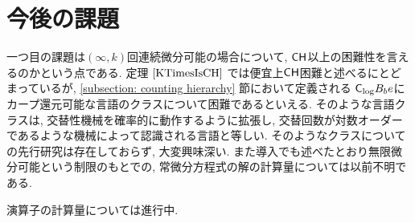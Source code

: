 \section{今後の課題}
一つ目の課題は$(\infty, k)$回連続微分可能の場合について,
$\mathsf{CH}$以上の困難性を言えるのかという点である.
定理 $\ref{KTimesIsCH}$ では便宜上$\mathsf{CH}$困難と述べるにとどまっているが,
\ref{subsection: counting hierarchy} 節において定義される
$\mathsf{C}_{\log} B_be$にカープ還元可能な言語のクラスについて困難であるといえる.
そのような言語クラスは, 交替性機械を確率的に動作するように拡張し,
交替回数が対数オーダーであるような機械によって認識される言語と等しい.
そのようなクラスについての先行研究は存在しておらず, 大変興味深い.
また導入でも述べたとおり無限微分可能という制限のもとでの,
常微分方程式の解の計算量については以前不明である.

演算子の計算量については進行中.
